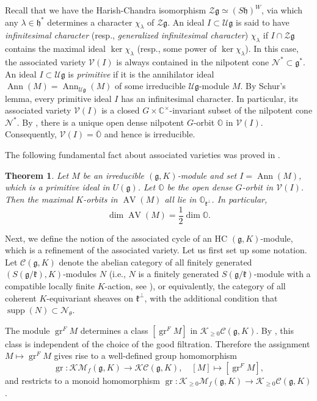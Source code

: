 \documentclass[11pt, a4paper]{amsart}
\newcommand{\C}{\mathbb{C}}
\newcommand{\g}{\mathfrak{g}}
\newcommand{\orb}{\mathbb{O}}
\newcommand{\gr}{\operatorname{gr}}
\newcommand{\fg}{\mathfrak{g}}
\newcommand{\fh}{\mathfrak{h}}
\newcommand{\fk}{\mathfrak{k}}
\newcommand{\cC}{\mathcal{C}}
\newcommand{\cK}{\mathcal{K}}
\newcommand{\cM}{\mathcal{M}}
\newcommand{\cN}{\mathcal{N}}
\newcommand{\cV}{\mathcal{V}}
\newcommand{\cZ}{\mathcal{Z}}
\newcommand{\cU}{\mathcal{U}}
\newcommand{\Ug}{\cU\fg}
\newcommand{\Zg}{\cZ\fg}
\newcommand{\MgK}{\cM_f(\g,K)}
\DeclareMathOperator{\AV}{AV}
\DeclareMathOperator{\Ann}{Ann}
\DeclareMathOperator{\supp}{supp}
\newcommand{\cm}{\C^\times}
\newtheorem{Thm}{Theorem}[subsection]
\theoremstyle{definition}
\numberwithin{equation}{section}
\begin{document}
Recall that we have the Harish-Chandra isomorphism $\Zg \simeq (S\fh)^W$, via which any $\lambda \in \fh^*$ determines a character $\chi_\lambda$ of $\Zg$. An ideal $I \subset \Ug$ is said to have \emph{infinitesimal character} (resp., \emph{generalized infinitesimal character}) $\chi_\lambda$ if $I \cap \Zg$ contains the maximal ideal $\ker \chi_\lambda$ (resp., some power of $\ker \chi_\lambda$). In this case, the associated variety $\cV(I)$ is always contained in the nilpotent cone $\cN^* \subset \fg^*$. An ideal $I \subset \Ug$ is \emph{primitive} if it is the annihilator ideal $\Ann(M) = \Ann_{\Ug}(M)$ of some irreducible $\Ug$-module $M$. By Schur's lemma, every primitive ideal $I$ has an infinitesimal character. In particular, its associated variety $\cV(I)$ is a closed $G \times \cm$-invariant subset of the nilpotent cone $\cN^*$. By \cite{Joseph:associated_variety}, there is a unique open dense nilpotent $G$-orbit $\orb$ in $\cV(I)$. Consequently, $\cV(I) = \overline{\orb}$ and hence is irreducible. 

The following fundamental fact about associated varieties was proved in \cite[Theorem 8.4]{Vogan_AV}. 

\begin{Thm} \label{thm:V_AV}
	Let $M$ be an irreducible $(\fg,K)$-module and set $I=\Ann(M)$, which is a primitive ideal in $U(\fg)$. Let $\orb$ be the open dense $G$-orbit in $\cV(I)$. Then the maximal $K$-orbits in $\AV(M)$ all lie in $\orb_{\fk^\perp}$. In particular,
	$$\dim \AV(M) = \frac{1}{2} \dim \orb.$$
\end{Thm}

Next, we define the notion of the associated cycle of an HC $(\g,K)$-module, which is a refinement of the associated variety. Let us first set up some notation. Let $\cC(\g,K)$ denote the abelian category of all finitely generated $(S(\g/\fk),K)$-modules $N$ (i.e., $N$ is a finitely generated $S(\g/\fk)$-module with a compatible locally finite $K$-action, see \cite[(2.1)(c)]{Vogan_AV}), or equivalently, the category of all coherent $K$-equivariant sheaves on $\fk^\perp$, with the additional condition that $\supp(N) \subset \cN_\theta$. 

The module $\gr^F M$ determines a class $[\gr^F M]$ in $\cK_{\geqslant 0}\cC(\g,K)$. By \cite[Proposition 2.2]{Vogan_AV}, this class is independent of the choice of the good filtration. Therefore the assignment $M \mapsto \gr^F M$ gives rise to a well-defined group homomorphism 
  \[ \gr: \cK\MgK\rightarrow \cK\cC(\g,K), \quad [M] \mapsto [\gr^F M], \] 
and restricts to a monoid homomorphism $\gr: \cK_{\geqslant 0}\MgK\rightarrow \cK_{\geqslant 0}\cC(\g,K)$.
\end{document}

